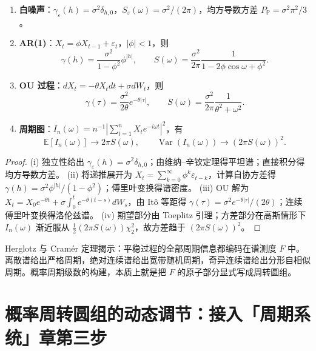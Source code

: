 \begin{proposition}[典型平稳过程的谱结构]\label{prop:typical_prob_spectra}
\begin{enumerate}[label=(\roman*)]
    \item \textbf{白噪声}：$\gamma_\varepsilon(h)=\sigma^2\delta_{h,0}$，$S_\varepsilon(\omega)=\sigma^2/(2\pi)$，均方导数方差 $P_{\mathbb P}=\sigma^2\pi^2/3$。
    \item \textbf{AR(1)}：$X_t=\phi X_{t-1}+\varepsilon_t$，$|\phi|<1$，则
    \[
    \gamma(h)=\frac{\sigma^2}{1-\phi^2}\phi^{|h|},\qquad
    S(\omega)=\frac{\sigma^2}{2\pi}\frac{1}{1-2\phi\cos\omega+\phi^2}.
    \]
    \item \textbf{OU 过程}：$dX_t=-\theta X_tdt+\sigma dW_t$，则
    \[
    \gamma(\tau)=\frac{\sigma^2}{2\theta}e^{-\theta|\tau|},\qquad
    S(\omega)=\frac{\sigma^2}{2\pi}\frac{1}{\theta^2+\omega^2}.
    \]
    \item \textbf{周期图}：$I_n(\omega)=n^{-1}|\sum_{t=1}^nX_t e^{-i\omega t}|^2$，有
    \[
    \mathbb E[I_n(\omega)]\to 2\pi S(\omega),\qquad
    \operatorname{Var}(I_n(\omega))\to (2\pi S(\omega))^2.
    \]
\end{enumerate}
\end{proposition}

\begin{proof}
(i) 独立性给出 $\gamma_\varepsilon(h)=\sigma^2\delta_{h,0}$；由维纳--辛钦定理得平坦谱；直接积分得均方导数方差。
(ii) 将递推展开为 $X_t=\sum_{k=0}^\infty\phi^k\varepsilon_{t-k}$，计算自协方差得 $\gamma(h)=\sigma^2\phi^{|h|}/(1-\phi^2)$；傅里叶变换得谱密度。
(iii) OU 解为 $X_t=X_0e^{-\theta t}+\sigma\int_0^t e^{-\theta(t-s)}dW_s$，由 Itô 等距得 $\gamma(\tau)=\sigma^2 e^{-\theta|\tau|}/(2\theta)$；连续傅里叶变换得洛伦兹谱。
(iv) 期望部分由 Toeplitz 引理；方差部分在高斯情形下 $I_n(\omega)$ 渐近服从 $\frac12(2\pi S(\omega))\chi^2_2$，故方差趋于 $(2\pi S(\omega))^2$。
\end{proof}

\begin{remark}[谱表示与周期结构的关系]\label{rem:spectral_period_relation}
Herglotz 与 Cramér 定理揭示：平稳过程的全部周期信息都编码在谱测度 $F$ 中。离散谱给出严格周期，绝对连续谱给出宽带随机周期，奇异连续谱给出分形自相似周期。概率周期级数的构建，本质上就是把 $F$ 的原子部分显式写成周转圆组。
\end{remark}

\section{概率周转圆组的动态调节：接入「周期系统」章第三步}
\label{sec:prob_adaptive}

